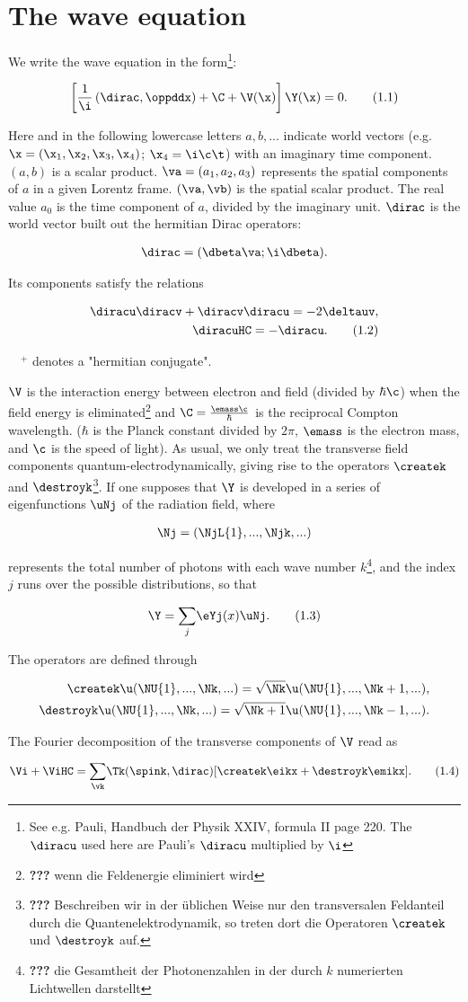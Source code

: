 \documentclass{article}
\newcommand{\WTF}[1]{\footnote{\textbf{???} #1}}
\newcommand{\nequ}[2]{
\begin{align*}
#1
\tag{#2}
\end{align*}
}
\newcommand{\uequ}[1]{
\begin{align*}
#1
\end{align*}
}
\newcommand{\HC}[1]{{#1^{+}}}
\newcommand{\inv}[1]{\frac{1}{#1}}
\newcommand{\sumX}[1]{\underset{#1}{\sum}}
\begin{document}
\section{The wave equation}
We write the wave equation in the form\footnote{See e.g. Pauli, Handbuch der Physik XXIV, formula II page 220. The $\diracu$ used here are Pauli's $\diracu$ multiplied by $\i$}:

\nequ{
\left[
\inv{\i}\left(\dirac, \oppddx \right) + \C + \V(\x)
\right]\Y(\x) = 0.
}{1.1}

Here and in the following lowercase letters $a, b, ...$ indicate world vectors (e.g. $\x = (\x_1, \x_2, \x_3, \x_4)$; $\x_4 = \i\c\t$) with an imaginary time component. $(a, b)$ is a scalar product. $\va = (a_1, a_2, a_3)$ represents the spatial components of $a$ in a given Lorentz frame. $(\va, \vb)$ is the spatial scalar product. The real value $a_0$ is the time component of $a$, divided by the imaginary unit. $\dirac$ is the world vector built out the hermitian Dirac operators:
\uequ{
\dirac = (\dbeta\va; \i\dbeta).
}
Its components satisfy the relations
\nequ{
\diracu\diracv + \diracv\diracu = -2\deltauv,\\
\diracuHC = -\diracu.
}{1.2}

$\HC{\quad}$ denotes a "hermitian conjugate".

$\V$ is the interaction energy between electron and field (divided by $\hbar\c$) when the field energy is eliminated\WTF{wenn die Feldenergie eliminiert wird} and $\C=\frac{\emass\c}{\hbar}$ is the reciprocal Compton wavelength. ($\hbar$ is the Planck constant divided by $2\pi$, $\emass$ is the electron mass, and $\c$ is the speed of light). As usual, we only treat the transverse field components quantum-electrodynamically, giving rise to the operators $\createk$ and $\destroyk$\WTF{Beschreiben wir in der üblichen Weise nur den transversalen Feldanteil durch die Quantenelektrodynamik, so treten dort die Operatoren $\createk$ und $\destroyk$ auf.}. If one supposes that $\Y$ is developed in a series of eigenfunctions $\uNj$ of the radiation field, where
\uequ{
\Nj = (\NjL{1},...,\Njk,...)
}
represents the total number of photons with each wave number $k$\WTF{die Gesamtheit der Photonenzahlen in der durch $k$ numerierten Lichtwellen darstellt}, and the index $j$ runs over the possible distributions, so that
\nequ{
\Y=\sumX{j}\eYj(x)\uNj.
}{1.3}
The operators are defined through
\uequ{
\createk\u(\NU{1},...,\Nk,...) = \sqrt{\Nk}\u(\NU{1},...,\Nk+1,...),\\
\destroyk\u(\NU{1},...,\Nk,...) = \sqrt{\Nk+1}\u(\NU{1},...,\Nk-1,...).
}
The Fourier decomposition of the transverse components of $\V$ read as
\nequ{
\Vi + \ViHC = \sumX{\vk}\Tk(\spink, \dirac)\lbrack\createk\eikx + \destroyk\emikx\rbrack.
}{1.4}
\end{document}
